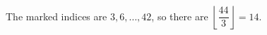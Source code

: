 The marked indices are $3,6,\ldots,42$, so there are $\left\lfloor\dfrac{44}{3}\right\rfloor=\boxed{14}$.
